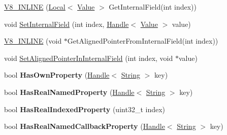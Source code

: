 \begin{DoxyCompactItemize}
\item 
\hyperlink{classv8_1_1_object_a478c557d3d547921436d1f8312deb831}{V8\+\_\+\+I\+N\+L\+I\+N\+E} (\hyperlink{classv8_1_1_local}{Local}$<$ \hyperlink{classv8_1_1_value}{Value} $>$ Get\+Internal\+Field(int index))
\item 
void \hyperlink{classv8_1_1_object_a361b1781e7db29b17b063ef31315989e}{Set\+Internal\+Field} (int index, \hyperlink{classv8_1_1_handle}{Handle}$<$ \hyperlink{classv8_1_1_value}{Value} $>$ value)
\item 
\hyperlink{classv8_1_1_object_abb14a7d7817c7b988957b3ad495adcca}{V8\+\_\+\+I\+N\+L\+I\+N\+E} (void $\ast$Get\+Aligned\+Pointer\+From\+Internal\+Field(int index))
\item 
void \hyperlink{classv8_1_1_object_a0ccba69581f0b5e4e672bab90f26879b}{Set\+Aligned\+Pointer\+In\+Internal\+Field} (int index, void $\ast$value)
\item 
\hypertarget{classv8_1_1_object_a3ec4bcaa4e875987cc1845820a733777}{}bool {\bfseries Has\+Own\+Property} (\hyperlink{classv8_1_1_handle}{Handle}$<$ \hyperlink{classv8_1_1_string}{String} $>$ key)\label{classv8_1_1_object_a3ec4bcaa4e875987cc1845820a733777}

\item 
\hypertarget{classv8_1_1_object_a5c29998a9ec60802b052f528a1aaa7fd}{}bool {\bfseries Has\+Real\+Named\+Property} (\hyperlink{classv8_1_1_handle}{Handle}$<$ \hyperlink{classv8_1_1_string}{String} $>$ key)\label{classv8_1_1_object_a5c29998a9ec60802b052f528a1aaa7fd}

\item 
\hypertarget{classv8_1_1_object_a29dce0e7da968dae54614501f035f7e9}{}bool {\bfseries Has\+Real\+Indexed\+Property} (uint32\+\_\+t index)\label{classv8_1_1_object_a29dce0e7da968dae54614501f035f7e9}

\item 
\hypertarget{classv8_1_1_object_aa501acb241c3b3a941b9f48c23b1e1cd}{}bool {\bfseries Has\+Real\+Named\+Callback\+Property} (\hyperlink{classv8_1_1_handle}{Handle}$<$ \hyperlink{classv8_1_1_string}{String} $>$ key)\label{classv8_1_1_object_aa501acb241c3b3a941b9f48c23b1e1cd}


\end{DoxyCompactItemize}
